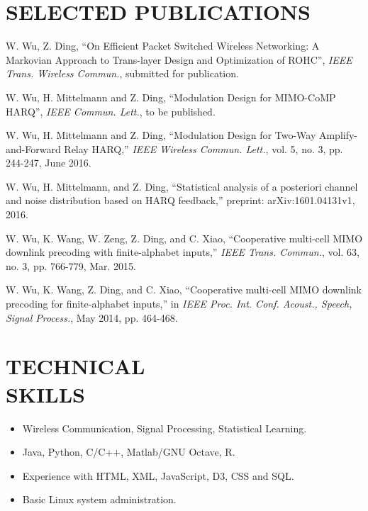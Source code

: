 \documentclass[margin]{res} %
\begin{document}
\begin{resume}
        \section{SELECTED PUBLICATIONS}
        \begin{enumerate}[label={[\arabic*]}]
          \item W. Wu, Z. Ding, ``On Efficient Packet Switched
          Wireless Networking: A Markovian Approach to Trans-layer Design and
          Optimization of ROHC'', \emph{IEEE Trans. Wireless Commun.}, submitted
          for publication.
          \item W. Wu, H. Mittelmann and Z. Ding, ``Modulation Design for
          MIMO-CoMP HARQ'', \emph{IEEE Commun. Lett.}, to be published.
          \item W. Wu, H. Mittelmann and Z. Ding, ``Modulation Design for
          Two-Way Amplify-and-Forward Relay HARQ,'' \emph{IEEE Wireless
          Commun. Lett.}, vol. 5, no. 3, pp. 244-247, June 2016.
          \item W. Wu, H. Mittelmann, and Z. Ding, ``Statistical analysis of a
          posteriori channel and noise distribution based on HARQ feedback,”
          preprint: arXiv:1601.04131v1, 2016.
          \item W. Wu, K. Wang, W. Zeng, Z. Ding, and C. Xiao,
          ``Cooperative multi-cell MIMO downlink precoding with
          finite-alphabet inputs,'' \emph{IEEE Trans. Commun.}, vol. 63, no.
          3, pp. 766-779, Mar. 2015.
          \item W. Wu, K. Wang, Z. Ding, and C. Xiao, ``Cooperative multi-cell
          MIMO downlink precoding for finite-alphabet inputs,'' in
          \emph{IEEE Proc. Int. Conf. Acoust., Speech, Signal Process.}, May
          2014, pp. 464-468.
        \end{enumerate}
        
        \section{TECHNICAL \\ SKILLS}
        
        \begin{itemize}
            \item Wireless Communication, Signal Processing, Statistical
            Learning.
            \item Java, Python, C/C++, Matlab/GNU Octave, R.
            \item Experience with HTML, XML, JavaScript, D3, CSS and SQL.
            \item Basic Linux system administration.
        \end{itemize} 
    

\end{resume}
\end{document}
